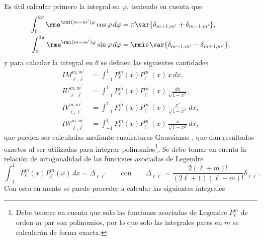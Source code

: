 Es útil calcular primero la integral en $\varphi$, teniendo en cuenta que 
\begin{align}
\int_0^{2\pi} \rme^{\rmi (m-m^{\prime}) \varphi} \cos\varphi  \, d\varphi &= \pi \var{ \delta_{m+1, m^{\prime}} + \delta_{m-1, m^{\prime}} },\\
\int_0^{2\pi} \rme^{\rmi (m-m^{\prime}) \varphi} \sin\varphi  \, d\varphi &= \rmi \pi \var{ \delta_{m-1, m^{\prime}} - \delta_{m+1, m^{\prime}} },
\end{align}
y para calcular la integral en $\theta$ se definen las siguientes cantidades
\begin{align}
IM_{\ell,\ell^{\prime}}^{m,m^{\prime}} &=\int_{-1}^1 P_{\ell}^{m}(x) P_{\ell^{\prime}}^{m^{\prime}}(x) \,x \, dx, \\
IU_{\ell,\ell^{\prime}}^{m,m^{\prime}} &=\int_{-1}^1 P_{\ell}^{m}(x) P_{\ell^{\prime}}^{m^{\prime}}(x) \, \frac{dx}{\sqrt{1-x^2}}, \\
IV_{\ell,\ell^{\prime}}^{m,m^{\prime}} &=\int_{-1}^1 P_{\ell}^{m}(x) P_{\ell^{\prime}}^{m^{\prime}}(x) \, \frac{x^2}{\sqrt{1-x^2}} \, dx, \\
IW_{\ell,\ell^{\prime}}^{m,m^{\prime}} &=\int_{-1}^1 P_{\ell}^{m}(x) P_{\ell^{\prime}}^{m^{\prime}}(x) \, \frac{x}{\sqrt{1-x^2}} \, dx, 
\end{align}
que pueden ser calculadas mediante cuadraturas Gaussianas \cite{kahaner1989numerical}, que dan resultados exactos al ser utilizadas para integrar polinomios\footnote{Debe tenerse en cuenta que solo las funciones asociadas de Legendre $P_{\ell}^m$ de orden $m$ par son polinomios, por lo que solo las integrales pares en $m$ se calcularán de forma exacta.}. Se debe tomar en cuenta la relación de ortogonalidad de las funciones asociadas de Legendre \cite{Abramowitz}
\begin{equation}
\int_{-1}^{1} P_{\ell}^{m}(x) P_{\ell^{\prime}}^{m}(x) \, dx = \Delta_{\ell \ell^{\prime}} \qquad \text{con} \qquad \Delta_{\ell \ell^{\prime}}= \frac{2(\ell+m)!}{(2\ell+1)(\ell-m)!} \delta_{\ell \ell^{\prime}}.
\end{equation}
Con esto en mente se puede proceder a calcular las siguientes integrales
